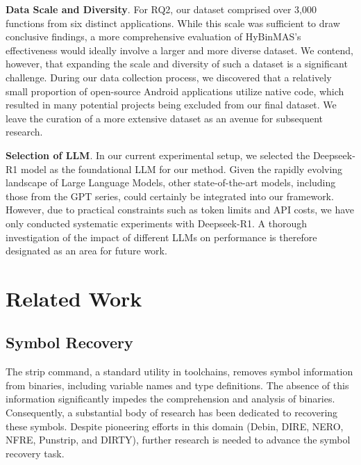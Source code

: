 \documentclass[acmsmall,screen,review,anonymous]{acmart} %
\begin{document}
\textbf{Data Scale and Diversity}. For RQ2, our dataset comprised over 3,000 functions from six distinct applications. While this scale was sufficient to draw conclusive findings, a more comprehensive evaluation of HyBinMAS's effectiveness would ideally involve a larger and more diverse dataset. We contend, however, that expanding the scale and diversity of such a dataset is a significant challenge. During our data collection process, we discovered that a relatively small proportion of open-source Android applications utilize native code, which resulted in many potential projects being excluded from our final dataset. We leave the curation of a more extensive dataset as an avenue for subsequent research.

\textbf{Selection of LLM}. In our current experimental setup, we selected the Deepseek-R1 model as the foundational LLM for our method. Given the rapidly evolving landscape of Large Language Models, other state-of-the-art models, including those from the GPT series, could certainly be integrated into our framework. However, due to practical constraints such as token limits and API costs, we have only conducted systematic experiments with Deepseek-R1. A thorough investigation of the impact of different LLMs on performance is therefore designated as an area for future work.





\section{Related Work}
\subsection{Symbol Recovery}

The strip command, a standard utility in toolchains, removes symbol information from binaries, including variable names and type definitions. The absence of this information significantly impedes the comprehension and analysis of binaries. Consequently, a substantial body of research has been dedicated to recovering these symbols. Despite pioneering efforts in this domain (Debin, DIRE, NERO, NFRE, Punstrip, and DIRTY), further research is needed to advance the symbol recovery task.
\end{document}
